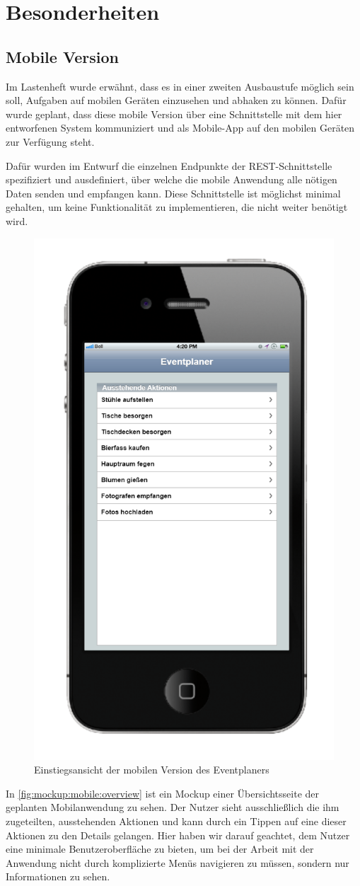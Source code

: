 \chapter{Besonderheiten}
\section{Mobile Version}

\FloatBarrier

Im Lastenheft wurde erwähnt, dass es in einer zweiten Ausbaustufe möglich sein soll, Aufgaben auf mobilen Geräten einzusehen und abhaken zu können. Dafür wurde geplant, dass diese mobile Version über eine Schnittstelle mit dem hier entworfenen System kommuniziert und als Mobile-App auf den mobilen Geräten zur Verfügung steht.

Dafür wurden im Entwurf die einzelnen Endpunkte der REST-Schnittstelle spezifiziert und ausdefiniert, über welche die mobile Anwendung alle nötigen Daten senden und empfangen kann. Diese Schnittstelle ist möglichst minimal gehalten, um keine Funktionalität zu implementieren, die nicht weiter benötigt wird.

\begin{figure}[ht!]
    \centering
    \includegraphics[width=0.4\columnwidth]{Bilder/mockup_mobile_overview.png}
    \caption{Einstiegsansicht der mobilen Version des Eventplaners}
    \label{fig:mockup:mobile:overview}
\end{figure}

In \autoref{fig:mockup:mobile:overview} ist ein Mockup einer Übersichtsseite der geplanten Mobilanwendung zu sehen. Der Nutzer sieht ausschließlich die ihm zugeteilten, ausstehenden Aktionen und kann durch ein Tippen auf eine dieser Aktionen zu den Details gelangen. Hier haben wir darauf geachtet, dem Nutzer eine minimale Benutzeroberfläche zu bieten, um bei der Arbeit mit der Anwendung nicht durch komplizierte Menüs navigieren zu müssen, sondern nur Informationen zu sehen.

